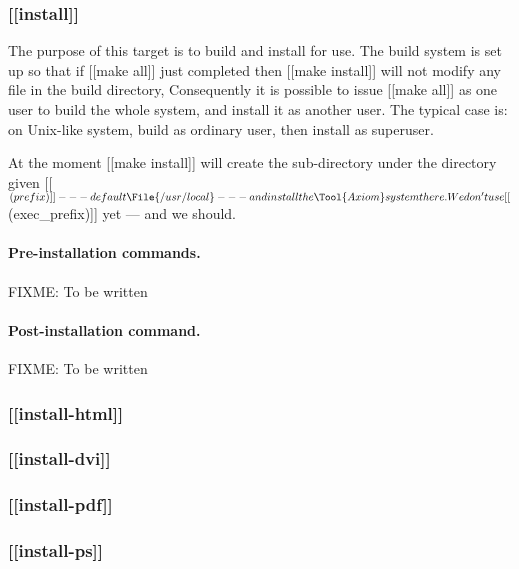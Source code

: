 \documentclass{article}
\begin{document}
\subsubsection{[[install]]}
\label{sec:general-structure:std-targets:install}

The purpose of this target is to build  and install for
use.  The build system is set up  so that if [[make all]] just completed
then [[make install]] will not modify any file in the build directory,
Consequently it is possible to issue [[make all]] as one
user to build the whole system, and install it as another user.  The typical
case is: on Unix-like system, build as ordinary user, then install as
superuser.

At the moment [[make install]] will create the sub-directory 
under the directory given [[$(prefix)]] --- default \File{/usr/local} ---
and install the \Tool{Axiom} system there.  We don't use
[[$(exec_prefix)]] yet --- and we should.

\paragraph{Pre-installation commands.}
FIXME: To be written

\paragraph{Post-installation command.}
FIXME: To be written

\subsubsection{[[install-html]]}
\label{sec:general-structure:std-targets:install-html}

\subsubsection{[[install-dvi]]}
\label{sec:general-structure:std-targets:install-dvi}

\subsubsection{[[install-pdf]]}
\label{sec:general-structure:std-targets:install-pdf}

\subsubsection{[[install-ps]]}
\label{sec:general-structure:std-targets:install-ps}
\end{document}
